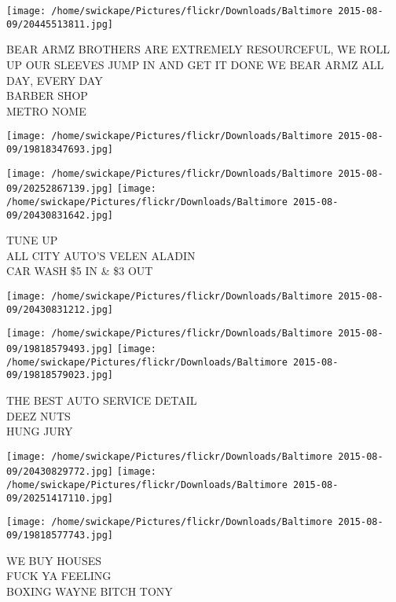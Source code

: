 \documentclass[10pt,letterpaper]{article}
\begin{document}
\vspace{0.25in}
\texttt{[image: /home/swickape/Pictures/flickr/Downloads/Baltimore 2015-08-09/20445513811.jpg]}

BEAR ARMZ BROTHERS ARE EXTREMELY RESOURCEFUL, WE ROLL UP OUR SLEEVES JUMP IN AND GET IT DONE WE BEAR ARMZ ALL DAY, EVERY DAY\\
BARBER SHOP\\
METRO NOME\\
\pagebreak

\texttt{[image: /home/swickape/Pictures/flickr/Downloads/Baltimore 2015-08-09/19818347693.jpg]}

\vspace{0.25in}
\texttt{[image: /home/swickape/Pictures/flickr/Downloads/Baltimore 2015-08-09/20252867139.jpg]}
\texttt{[image: /home/swickape/Pictures/flickr/Downloads/Baltimore 2015-08-09/20430831642.jpg]}

TUNE UP\\
ALL CITY AUTO'S VELEN ALADIN\\
CAR WASH \$5 IN \& \$3 OUT\\
\pagebreak

\texttt{[image: /home/swickape/Pictures/flickr/Downloads/Baltimore 2015-08-09/20430831212.jpg]}

\vspace{0.25in}
\texttt{[image: /home/swickape/Pictures/flickr/Downloads/Baltimore 2015-08-09/19818579493.jpg]}
\texttt{[image: /home/swickape/Pictures/flickr/Downloads/Baltimore 2015-08-09/19818579023.jpg]}

THE BEST AUTO SERVICE DETAIL\\
DEEZ NUTS\\
HUNG JURY\\
\pagebreak

\texttt{[image: /home/swickape/Pictures/flickr/Downloads/Baltimore 2015-08-09/20430829772.jpg]}
\texttt{[image: /home/swickape/Pictures/flickr/Downloads/Baltimore 2015-08-09/20251417110.jpg]}

\texttt{[image: /home/swickape/Pictures/flickr/Downloads/Baltimore 2015-08-09/19818577743.jpg]}

WE BUY HOUSES\\
FUCK YA FEELING\\
BOXING WAYNE BITCH TONY\\
\pagebreak
\end{document}

